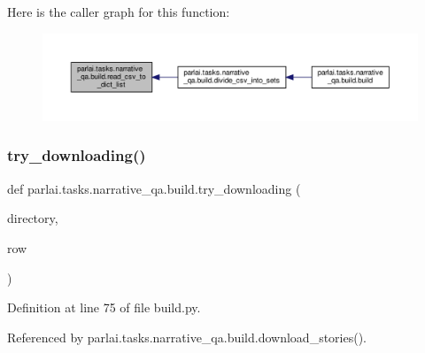 Here is the caller graph for this function\+:
\nopagebreak
\begin{figure}[H]
\begin{center}
\leavevmode
\includegraphics[width=350pt]{namespaceparlai_1_1tasks_1_1narrative__qa_1_1build_a7fae633ea705d970c2a6d56b7004f6cd_icgraph}
\end{center}
\end{figure}
\mbox{\label{namespaceparlai_1_1tasks_1_1narrative__qa_1_1build_a9af345566fd27c286f7fef146b2cf00b}} 
\subsubsection{\texorpdfstring{try\+\_\+downloading()}{try\_downloading()}}
{\footnotesize\ttfamily def parlai.\+tasks.\+narrative\+\_\+qa.\+build.\+try\+\_\+downloading (\begin{DoxyParamCaption}\item[{}]{directory,  }\item[{}]{row }\end{DoxyParamCaption})}



Definition at line 75 of file build.\+py.



Referenced by parlai.\+tasks.\+narrative\+\_\+qa.\+build.\+download\+\_\+stories().

